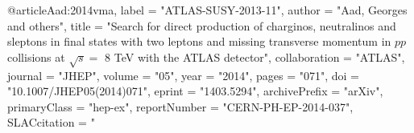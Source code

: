 @article{Aad:2014vma,
      label          = "ATLAS-SUSY-2013-11",
      author         = "Aad, Georges and others",
      title          = "{Search for direct production of charginos, neutralinos
                        and sleptons in final states with two leptons and missing
                        transverse momentum in $pp$ collisions at $\sqrt{s} =$ 8
                        TeV with the ATLAS detector}",
      collaboration  = "ATLAS",
      journal        = "JHEP",
      volume         = "05",
      year           = "2014",
      pages          = "071",
      doi            = "10.1007/JHEP05(2014)071",
      eprint         = "1403.5294",
      archivePrefix  = "arXiv",
      primaryClass   = "hep-ex",
      reportNumber   = "CERN-PH-EP-2014-037",
      SLACcitation   = "%
}

